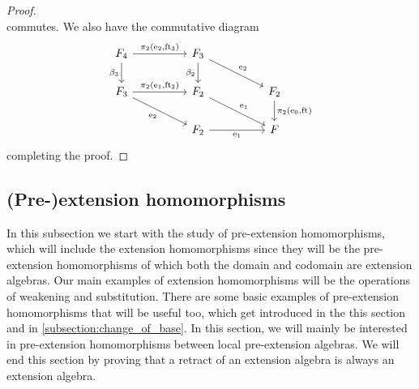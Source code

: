 \begin{proof}
\begin{equation*}
\end{equation*}
commutes. We also have the commutative diagram
\begin{equation*}
\begin{tikzcd}[column sep=huge]
\stesysf_4
  \ar{r}{\pullbackpr{2}{\eext{2}}{\eft[3]}}
  \ar{d}[swap]{\beta_3}
  &
\stesysf_3
  \ar{dr}{\eext{2}}
  \ar{d}[swap]{\beta_2}
  \\
\stesysf_3
  \ar{r}{\pullbackpr{2}{\efamext}{\eft[2]}}
  \ar{dr}[swap]{\eext{2}}
  &
\stesysf_2
  \ar{dr}{\efamext}
  &
\stesysf_2
  \ar{d}{\pullbackpr{2}{\ectxext}{\eft}}
  \\
  {} &
\stesysf_2
  \ar{r}[swap]{\efamext}
  &
\stesysf
\end{tikzcd}
\end{equation*}
completing the proof.
\end{proof}

\subsection{(Pre-)extension homomorphisms}\label{subsection:e_extension_homomorphisms}
In this subsection we start with the study of pre-extension homomorphisms, which
will include the extension homomorphisms since they will be the pre-extension
homomorphisms of which both the domain and codomain are extension algebras.
Our main examples of extension homomorphisms will be the operations of weakening
and substitution. There are some basic examples of pre-extension homomorphisms
that will be useful too, which get introduced in the this section and in
\autoref{subsection:change_of_base}. In this section, we will mainly be
interested in pre-extension homomorphisms between local pre-extension algebras.
We will end this section by proving that a retract of an extension algebra is
always an extension algebra.

